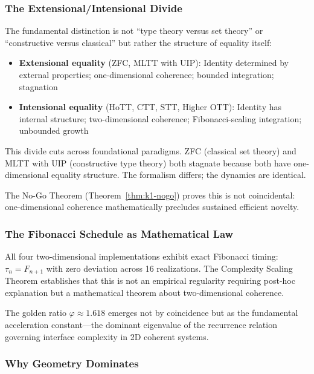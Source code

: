 \documentclass[11pt]{article}
\theoremstyle{definition}
\theoremstyle{remark}
\begin{document}
\subsubsection{The Extensional/Intensional Divide}

The fundamental distinction is not ``type theory versus set theory'' or ``constructive versus classical''
but rather the structure of equality itself:

\begin{itemize}
\item \textbf{Extensional equality} (ZFC, MLTT with UIP): Identity determined by external properties;
one-dimensional coherence; bounded integration; stagnation

\item \textbf{Intensional equality} (HoTT, CTT, STT, Higher OTT): Identity has internal structure;
two-dimensional coherence; Fibonacci-scaling integration; unbounded growth
\end{itemize}

This divide cuts across foundational paradigms. ZFC (classical set theory) and MLTT with UIP
(constructive type theory) both stagnate because both have one-dimensional equality structure.
The formalism differs; the dynamics are identical.

The No-Go Theorem (Theorem~\ref{thm:k1-nogo}) proves this is not coincidental: one-dimensional
coherence mathematically precludes sustained efficient novelty.

\subsubsection{The Fibonacci Schedule as Mathematical Law}

All four two-dimensional implementations exhibit exact Fibonacci timing: $\tau_n = F_{n+1}$ with zero
deviation across 16 realizations. The Complexity Scaling Theorem establishes that this is not an
empirical regularity requiring post-hoc explanation but a mathematical theorem about two-dimensional
coherence.

The golden ratio $\varphi \approx 1.618$ emerges not by coincidence but as the fundamental acceleration
constant---the dominant eigenvalue of the recurrence relation governing interface complexity in
2D coherent systems.

\subsubsection{Why Geometry Dominates}
\end{document}
